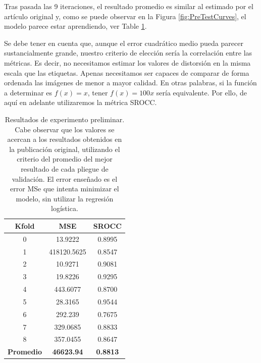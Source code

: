 Tras pasada las 9 iteraciones, el resultado promedio es similar al estimado 
por el artículo original y, como se puede observar en la Figura \ref{fig:PreTestCurves},
el modelo parece estar aprendiendo, ver Table \ref{tab:PreTestResults}. 

Se debe tener en cuenta que, aunque el error cuadrático medio pueda parecer 
sustancialmente grande, nuestro criterio de elección sería la correlación 
entre las métricas. Es decir, no necesitamos estimar los valores de distorsión 
en la misma escala que las etiquetas. Apenas necesitamos ser capaces de comparar 
de forma ordenada las imágenes de menor a mayor calidad. En otras palabras, 
si la función a determinar es $f(x) = x$, tener $f(x) = 100x$ sería equivalente.
Por ello, de aquí en adelante utilizaremos la métrica SROCC.

\begin{table}[htp]
  \scriptsize
  \begin{center}
    \begin{tabular}[c]{|c|c|c|}
      \hline
      \rowcolor[HTML]{FFC702}
      \textbf{Kfold} & \textbf{MSE} & \textbf{SROCC} \\ 
      \hline 
      0 & 13.9222 & 0.8995 \\
      \hline 
      1 & 418120.5625 & 0.8547 \\ 
      \hline 
      2 & 10.9271 & 0.9081 \\
      \hline 
      3 & 19.8226 & 0.9295 \\ 
      \hline 
      4 & 443.6077 & 0.8700 \\ 
      \hline 
      5 & 28.3165 & 0.9544 \\ 
      \hline 
      6 & 292.239 & 0.7675 \\ 
      \hline 
      7 & 329.0685 & 0.8833 \\ 
      \hline 
      8 & 357.0455 & 0.8647 \\ 
      \hline
      \textbf{\cellcolor[HTML]{FFC702}Promedio} & \textbf{46623.94} & \textbf{0.8813} \\ 
      \hline
    \end{tabular}
  \end{center}
  \caption[Resultados de experimento preliminar.]{Resultados de experimento preliminar. 
    Cabe observar que los valores se acercan a los resultados obtenidos en la publicación original, 
    utilizando el criterio del promedio del mejor resultado de cada pliegue de validación. El error 
    enseñado es el error MSe que intenta minimizar el modelo, sin utilizar la regresión logística.
}
  \label{tab:PreTestResults}
\end{table}

